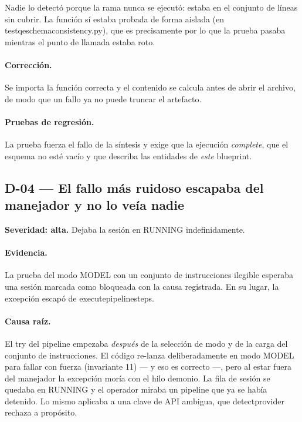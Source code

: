 \documentclass[11pt,a4paper]{article}
\newcommand{\code}[1]{{\ttfamily\small\def\_{\textunderscore\allowbreak}#1}}
\begin{document}
Nadie lo detectó porque la rama nunca se ejecutó: estaba en el conjunto de líneas sin cubrir.
La función sí estaba probada de forma aislada (en \code{test\_qe\_schema\_consistency.py}),
que es precisamente por lo que la prueba pasaba mientras el punto de llamada estaba roto.

\paragraph{Corrección.} Se importa la función correcta y el contenido se calcula antes de
abrir el archivo, de modo que un fallo ya no puede truncar el artefacto.

\paragraph{Pruebas de regresión.} La prueba fuerza el fallo de la síntesis y exige que la
ejecución \emph{complete}, que el esquema no esté vacío y que describa las entidades de
\emph{este} blueprint.

\subsection*{D-04 --- El fallo más ruidoso escapaba del manejador y no lo veía nadie}

\begin{finding}
\textbf{Severidad: alta.} Dejaba la sesión en \code{RUNNING} indefinidamente.
\end{finding}

\paragraph{Evidencia.} La prueba del modo MODEL con un conjunto de instrucciones ilegible
esperaba una sesión marcada como bloqueada con la causa registrada. En su lugar, la
excepción escapó de \code{\_execute\_pipeline\_steps}.

\paragraph{Causa raíz.} El \code{try} del pipeline empezaba \emph{después} de la selección de
modo y de la carga del conjunto de instrucciones. El código re-lanza deliberadamente en modo
MODEL para fallar con fuerza (invariante 11) --- y eso es correcto ---, pero al estar fuera
del manejador la excepción moría con el hilo demonio. La fila de sesión se quedaba en
\code{RUNNING} y el operador miraba un pipeline que ya se había detenido. Lo mismo aplicaba a
una clave de API ambigua, que \code{detect\_provider} rechaza a propósito.
\end{document}
